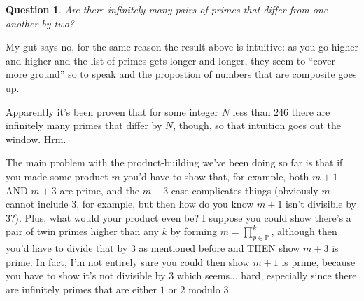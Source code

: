 \documentclass{article}
\newtheorem{ques}[thm]{Question}
\numberwithin{equation}{thm}
\begin{document}
\begin{ques} \label{2.47}
  Are there infinitely many pairs of primes that differ from one another by two?
\end{ques}

My gut says no, for the same reason the result above is intuitive: as you go higher and higher and the list of primes gets longer and longer, they seem to ``cover more ground'' so to speak and the propostion of numbers that are composite goes up.

Apparently it's been proven that for some integer $N$ less than $246$ there are infinitely many primes that differ by $N$, though, so that intuition goes out the window. Hrm.

The main problem with the product-building we've been doing so far is that if you made some product $m$ you'd have to show that, for example, both $m+1$ AND $m+3$ are prime, and the $m+3$ case complicates things (obviously $m$ cannot include $3$, for example, but then how do you know $m+1$ isn't divisible by $3$?). Plus, what would your product even be? I suppose you could show there's a pair of twin primes higher than any $k$ by forming $m = \prod_{p \in \mathbb{P}}^k$, although then you'd have to divide that by $3$ as mentioned before and THEN show $m + 3$ is prime. In fact, I'm not entirely sure you could then show $m+1$ is prime, because you have to show it's not divisible by $3$ which seems... hard, especially since there are infinitely primes that are either $1$ or $2$ modulo $3$.
\end{document}
